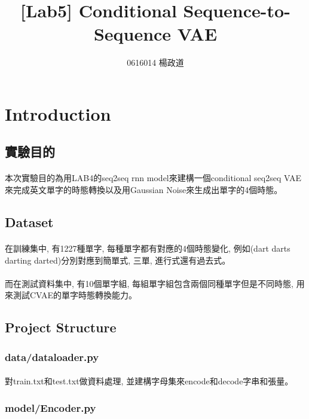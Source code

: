 \title{[Lab5] Conditional Sequence-to-Sequence VAE}
\author{0616014 楊政道}
\maketitle
\thispagestyle{fancy}
\section{Introduction}
\subsection{實驗目的}
\paragraph{}
本次實驗目的為用LAB4的seq2seq rnn model來建構一個conditional seq2seq VAE來完成英文單字的時態轉換以及用Gaussian Noise來生成出單字的4個時態。
\subsection{Dataset}
\paragraph{}
在訓練集中, 有1227種單字, 每種單字都有對應的4個時態變化, 例如(dart darts darting darted)分別對應到簡單式, 三單, 進行式還有過去式。 
\paragraph{}
而在測試資料集中, 有10個單字組, 每組單字組包含兩個同種單字但是不同時態, 用來測試CVAE的單字時態轉換能力。
\subsection{Project Structure}
\subsubsection{data/dataloader.py}
\paragraph{}
對train.txt和test.txt做資料處理, 並建構字母集來encode和decode字串和張量。
\subsubsection{model/Encoder.py}
